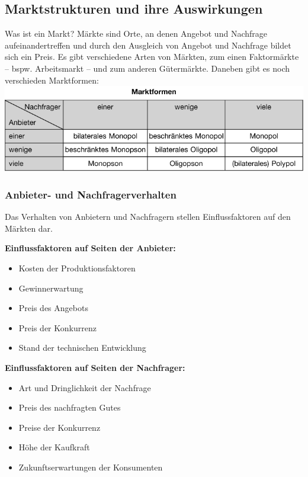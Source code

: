 \subsection{Marktstrukturen und ihre Auswirkungen}

Was ist ein Markt? Märkte sind Orte, an denen Angebot und Nachfrage aufeinandertreffen und durch den Ausgleich von Angebot und Nachfrage bildet sich ein Preis. Es gibt verschiedene Arten von Märkten, zum einen Faktormärkte -- bspw. Arbeitsmarkt -- und zum anderen Gütermärkte. Daneben gibt es noch verschieden Marktformen:\\
\includegraphics[scale=0.6]{pictures/lf01-pic/lf01-marktformen.png}

\subsubsection{Anbieter- und Nachfragerverhalten}
Das Verhalten von Anbietern und Nachfragern stellen Einflussfaktoren auf den Märkten dar.

{\bf Einflussfaktoren auf Seiten der Anbieter:}
\begin{itemize}
	\item Kosten der Produktionsfaktoren
	\item Gewinnerwartung
	\item Preis des Angebots
	\item Preis der Konkurrenz
	\item Stand der technischen Entwicklung
\end{itemize}

{\bf Einflussfaktoren auf Seiten der Nachfrager: }
\begin{itemize}
	\item Art und Dringlichkeit der Nachfrage
	\item Preis des nachfragten Gutes
	\item Preise der Konkurrenz
	\item Höhe der Kaufkraft
	\item Zukunftserwartungen der Konsumenten
\end{itemize}

